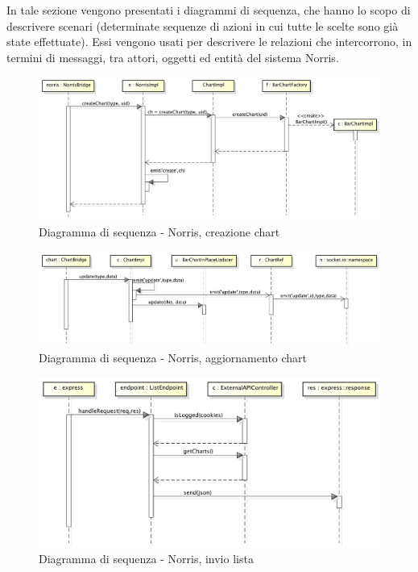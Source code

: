     	In tale sezione vengono presentati i diagrammi di sequenza, che hanno lo scopo di descrivere scenari (determinate sequenze di azioni in cui tutte le scelte sono già state effettuate). Essi vengono usati per descrivere le relazioni che intercorrono, in termini di messaggi, tra attori, oggetti ed entità del sistema Norris.
            \begin{figure}[H]
                \centering
                \includegraphics[scale=0.3]{DefinizioneDiProdotto/Pics/NorrisCreazioneChart}
                \caption{Diagramma di sequenza - Norris, creazione chart}
            \end{figure}


            \begin{figure}[H]
                \centering
                \includegraphics[scale=0.3]{DefinizioneDiProdotto/Pics/NorrisAggiornamentoChart}
                \caption{Diagramma di sequenza - Norris, aggiornamento chart}
            \end{figure}

            
            \begin{figure}[H]
                \centering
                \includegraphics[scale=0.3]{DefinizioneDiProdotto/Pics/NorrisInvioLista}
                \caption{Diagramma di sequenza - Norris, invio lista}
            \end{figure}


